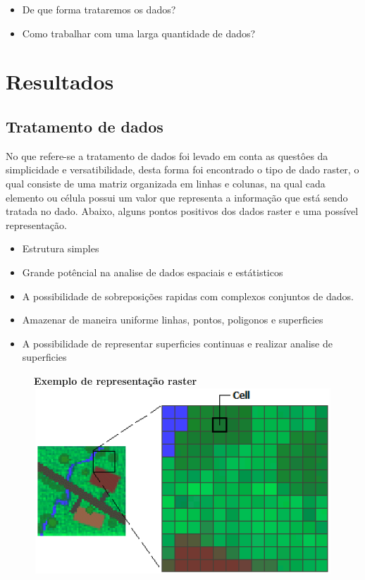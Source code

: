 \documentclass[12pt,letterpaper]{article}
\begin{document}
\begin{itemize}

\item De que forma trataremos os dados?
\item Como trabalhar com uma larga quantidade de dados?

\end{itemize}

\section{Resultados}

\subsection{Tratamento de dados}

No que refere-se a tratamento de dados foi levado em conta as questôes da simplicidade e versatibilidade, desta forma foi encontrado o tipo de dado raster, o qual consiste de uma matriz organizada em linhas e colunas, na qual cada elemento ou célula possui um valor que representa a informação que está sendo tratada no dado. Abaixo, alguns pontos positivos dos dados raster e uma possível representação.

\begin{itemize}

\item Estrutura simples
\item Grande potêncial na analise de dados espaciais e estátisticos
\item A possibilidade de sobreposições rapidas com complexos conjuntos de dados.
\item Amazenar de maneira uniforme linhas, pontos, poligonos e superficies
\item A possibilidade de representar superficies continuas e realizar analise de superficies

\end{itemize}

\begin{figure}
  \centering
  \textbf{Exemplo de representação raster}
   \includegraphics[width=15cm,height=7cm]{Raster.png}
\end{figure}
\end{document}
